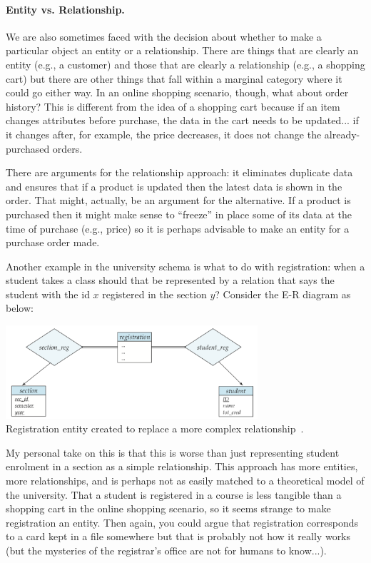 \paragraph{Entity vs. Relationship.} We are also sometimes faced with the decision about whether to make a particular object an entity or a relationship. There are things that are clearly an entity (e.g., a customer) and those that are clearly a relationship (e.g., a shopping cart) but there are other things that fall within a marginal category where it could go either way. In an online shopping scenario, though, what about order history? This is different from the idea of a shopping cart because if an item changes attributes before purchase, the data in the cart needs to be updated... if it changes after, for example, the price decreases, it does not change the already-purchased orders.

There are arguments for the relationship approach: it eliminates duplicate data and ensures that if a product is updated then the latest data is shown in the order. That might, actually, be an argument for the alternative. If a product is purchased then it might make sense to ``freeze'' in place some of its data at the time of purchase (e.g., price) so it is perhaps advisable to make an entity for a purchase order made. 

Another example in the university schema is what to do with registration: when a student takes a class should that be represented by a relation that says the student with the id $x$ registered in the section $y$? Consider the E-R diagram as below:

\begin{center}
	\includegraphics[width=0.7\textwidth]{images/reg-split}\\
	Registration entity created to replace a more complex relationship~\cite{dsc}.
\end{center}

My personal take on this is that this is worse than just representing student enrolment in a section as a simple relationship. This approach has more entities, more relationships, and is perhaps not as easily matched to a theoretical model of the university. That a student is registered in a course is less tangible than a shopping cart in the online shopping scenario, so it seems strange to make registration an entity. Then again, you could argue that registration corresponds to a card kept in a file somewhere but that is probably not how it really works (but the mysteries of the registrar's office are not for humans to know...).

